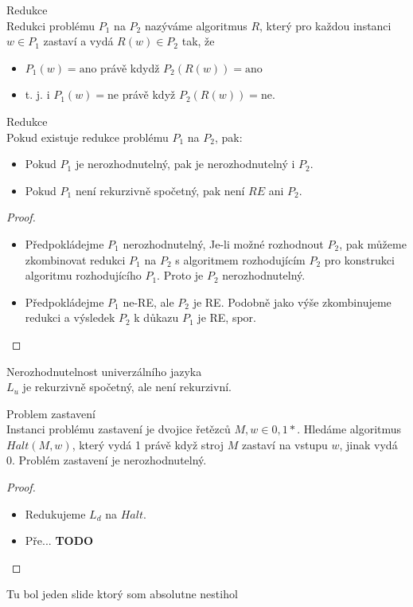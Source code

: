 \documentclass[../main.tex]{subfiles}
\begin{document}
\begin{definition}
    Redukce\\
    Redukci problému $P_1$ na $P_2$ nazýváme algoritmus $R$, který pro každou instanci $w\in P_1$ zastaví a vydá $R(w) \in P_2$ tak, že
    \begin{itemize}
        \item $P_1(w) = \text{ano}$ právě kdydž $P_2(R(w)) = \text{ano}$
        \item t. j. i $P_1(w) = \text{ne}$ právě když $P_2(R(w)) = \text{ne}.$
    \end{itemize}
\end{definition}
\begin{theorem}
    Redukce\\
    Pokud existuje redukce problému $P_1$ na $P_2$, pak:
    \begin{itemize}
        \item Pokud $P_1$ je nerozhodnutelný, pak je nerozhodnutelný i $P_2$.
        \item Pokud $P_1$ není rekurzivně spočetný, pak není $RE$ ani $P_2$.
    \end{itemize}
    \begin{proof}
        \begin{itemize}
            \item Předpokládejme $P_1$ nerozhodnutelný, Je-li možné rozhodnout $P_2$, pak můžeme zkombinovat redukci $P_1$ na $P_2$ s algoritmem
            rozhodujícím $P_2$ pro konstrukci algoritmu rozhodujícího $P_1$. Proto je $P_2$ nerozhodnutelný.
            \item Předpokládejme $P_1$ ne-RE, ale $P_2$ je RE. Podobně jako výše zkombinujeme redukci a výsledek $P_2$ k důkazu $P_1$ je RE, spor.
        \end{itemize}
    \end{proof}
\end{theorem}
\begin{theorem}
    Nerozhodnutelnost univerzálního jazyka\\
    $L_u$ je rekurzivně spočetný, ale není rekurzivní.
\end{theorem}
\begin{theorem}
    Problem zastavení\\

    Instanci problému zastavení je dvojice řetězců $M,w \in {0,1}*.$ Hledáme algoritmus $Halt(M,w)$, který vydá 1 právě když stroj $M$ zastaví na vstupu $w$, jinak vydá 0.
    Problém zastavení je nerozhodnutelný.
    \begin{proof}
        \begin{itemize}
            \item Redukujeme $L_d$ na $Halt$.
            \item Pře... \textbf{TODO}
        \end{itemize}
    \end{proof}
\end{theorem}
Tu bol jeden slide ktorý som absolutne nestihol
\end{document}
